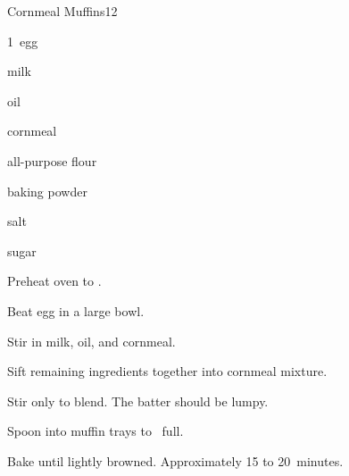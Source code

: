\begin{recipe}{Cornmeal Muffins}{}{12}

\begin{ingredients}
\item 1~egg
\item {} milk
\item {} oil
\item \C{\threequarter} cornmeal
\item \C{1\half} all-purpose flour
\item {} baking powder
\item \tp{\half} salt
\item {} sugar
\end{ingredients}

\begin{directions}
\item Preheat oven to .
\item Beat egg in a large bowl.
\item Stir in milk, oil, and cornmeal.
\item Sift remaining ingredients together into cornmeal mixture.
\item Stir only to blend. The batter should be lumpy.
\item Spoon into muffin trays to \twothird~full.
\item Bake until lightly browned. Approximately 15 to 20~minutes.
\end{directions}

\end{recipe}
